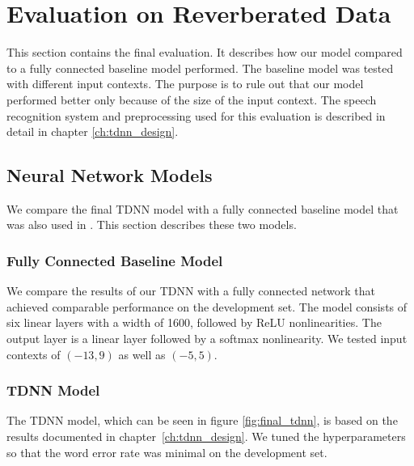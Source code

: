 
\chapter{Evaluation on Reverberated Data}
\label{ch:results}
This section contains the final evaluation. It describes how our model compared to a fully connected baseline model performed. The baseline model was tested with different input contexts. The purpose is to rule out that our model performed better only because of the size of the input context. The speech recognition system and preprocessing used for this evaluation is described in detail in chapter \ref{ch:tdnn_design}.
\section{Neural Network Models}
We compare the final TDNN model with a fully connected baseline model that was also used in \cite{nguyen20162016}. This section describes these two models. 
\subsection{Fully Connected Baseline Model}
We compare the results of our TDNN with a fully connected network that achieved comparable performance on the development set. The model consists of six linear layers with a width of 1600, followed by ReLU nonlinearities. The output layer is a linear layer followed by a softmax nonlinearity. We tested input contexts of $(-13, 9)$ as well as $(-5, 5)$.
\subsection{TDNN Model}
The TDNN model, which can be seen in figure \ref{fig:final_tdnn}, is based on the results documented in chapter~\ref{ch:tdnn_design}. We tuned the hyperparameters so that the word error rate was minimal on the development set. \\ 

